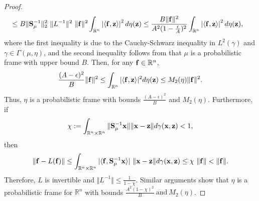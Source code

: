 \documentclass[10pt,a4paper]{amsart}
\begin{document}
\begin{proof}
\begin{equation*}
\begin{split}
 &\leq B \Vert  {\bf S}_\mu^{-1} \Vert_2^2  \ \Vert L^{-1} \Vert^2  \ \Vert {\bf f} \Vert^2   \int_{\mathbb{R}^n} \left|\langle {\bf f}, {\bf z} \rangle \right|^2 d\eta({\bf z}) \leq \frac{B\Vert {\bf f} \Vert^2}{A^2 (1-\frac{\epsilon}{A})^2 }  \int_{\mathbb{R}^n} \left| \langle {\bf f}, {\bf z} \rangle \right |^2 d\eta({\bf z}),
\end{split}
\end{equation*}
where the first inequality is due to the Cauchy-Schwarz inequality in $L^2(\gamma)$ and $\gamma \in \Gamma(\mu, \eta)$, and the second inequality follows from that $\mu$ is a probabilistic frame with upper bound $B$. 
Then, for any ${\bf f} \in \mathbb{R}^n$, 
$$ \frac{(A- \epsilon)^2}{B}    \Vert  {\bf f} \Vert^2  \leq   \int_{\mathbb{R}^n} |\langle {\bf f}, {\bf z} \rangle|^2 d\eta({\bf z}) \leq M_2(\eta) \Vert  {\bf f} \Vert^2.$$
Thus, $\eta$ is a probabilistic frame with bounds $\frac{(A- \epsilon)^2}{B}$ and $M_2(\eta)  $.
Furthermore, if 
\begin{equation*}
   \chi := \int_{\mathbb{R}^n \times \mathbb{R}^n}  \Vert {\bf S}_\mu^{-1} {\bf x}\Vert \Vert {\bf x}-{\bf z} \Vert  d \gamma({\bf x},{\bf z})<1,
\end{equation*}
then 
 \begin{equation*}
    \Vert {\bf f} -L({\bf f}) \Vert \leq  \int_{\mathbb{R}^n \times \mathbb{R}^n} |\langle {\bf f}, {\bf S}_\mu^{-1} {\bf x} \rangle| \ \|{\bf x}-{\bf z}\|  d \gamma({\bf x}, {\bf z}) \leq \chi \ \Vert  {\bf f} \Vert < \Vert  {\bf f} \Vert. 
\end{equation*}
Therefore, $L$ is invertible and $\Vert L^{-1} \Vert \leq \frac{1}{1-\chi}$.
Similar arguments show that $\eta$ is a probabilistic frame for $\mathbb{R}^n$ with bounds $\frac{A^2 (1-\chi)^2}{B} \ \text{and} \ M_2(\eta)$.
 \end{proof}
\end{document}
